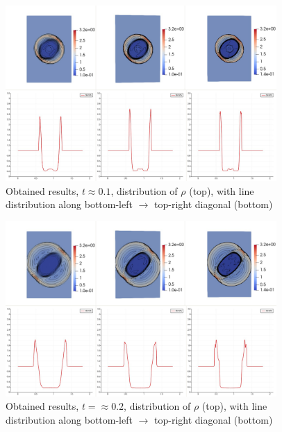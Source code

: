 \begin{figure}[H]
	\begin{center}
		\includegraphics[width=0.92\textwidth]{img/mhd-blast/new/blast,1noadapt1.jpg}
	\caption{Obtained results, $t \approx 0.1$, distribution of $\rho$ (top), with line distribution along bottom-left $\rightarrow$ top-right diagonal (bottom)}
	\label{figure:blastNew11}
	\end{center}
\end{figure}
\vspace{-8mm}

\begin{figure}[H]
	\begin{center}
		\includegraphics[width=0.92\textwidth]{img/mhd-blast/new/blast,1noadapt3.jpg}
	\caption{Obtained results, $t = \approx 0.2$, distribution of $\rho$ (top), with line distribution along bottom-left $\rightarrow$ top-right diagonal (bottom)}
	\label{figure:blastNew12}
	\end{center}
\end{figure}
\vspace{-8mm}

